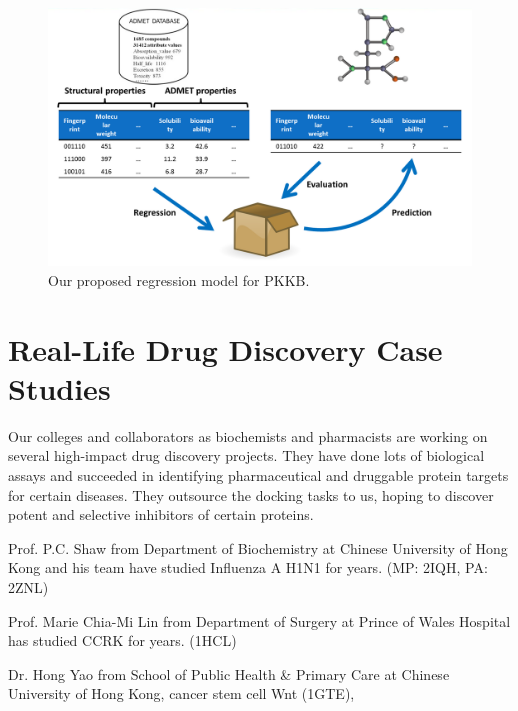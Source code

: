 \begin{figure}
\centering
\includegraphics[width=\linewidth]{PKKB/Regression.png}
\caption{Our proposed regression model for PKKB.}
\label{PKKB:Regression}
\end{figure}

\section{Real-Life Drug Discovery Case Studies}

Our colleges and collaborators as biochemists and pharmacists are working on several high-impact drug discovery projects. They have done lots of biological assays and succeeded in identifying pharmaceutical and druggable protein targets for certain diseases. They outsource the docking tasks to us, hoping to discover potent and selective inhibitors of certain proteins.

Prof. P.C. Shaw from Department of Biochemistry at Chinese University of Hong Kong and his team have studied Influenza A H1N1 for years.  (MP: 2IQH, PA: 2ZNL)

Prof. Marie Chia-Mi Lin from Department of Surgery at Prince of Wales Hospital has studied CCRK for years. (1HCL)

Dr. Hong Yao from School of Public Health \& Primary Care at Chinese University of Hong Kong, cancer stem cell Wnt (1GTE), 

\chapterend
